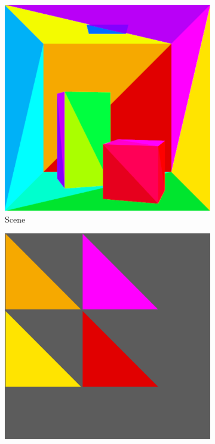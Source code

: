 \begin{figure}
	\centering
	\begin{subfigure}[t]{0.24\linewidth}
		\includegraphics[width=\textwidth]{chapters/chapter_thetool/uvmap_scene}
		\caption{Scene}
	\end{subfigure}
	\begin{subfigure}[t]{0.24\linewidth}
		\includegraphics[width=\textwidth]{chapters/chapter_thetool/uvmap_set0}

\end{subfigure}
\end{figure}
